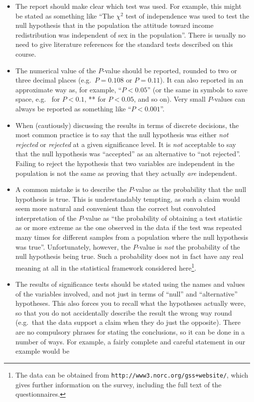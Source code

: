 \documentclass[11pt,a4paper,openany]{book}
\let\rmarkdownfootnote\footnote%
\def\footnote{\protect\rmarkdownfootnote}
\begin{document}
\begin{itemize}
\item
  The report should make clear which test was used. For example, this
  might be stated as something like ``The \(\chi^{2}\) test of
  independence was used to test the null hypothesis that in the
  population the attitude toward income redistribution was independent
  of sex in the population''. There is usually no need to give
  literature references for the standard tests described on this course.
\item
  The numerical value of the \(P\)-value should be reported, rounded to
  two or three decimal places (e.g.~\(P=0.108\) or \(P=0.11\)). It can
  also reported in an approximate way as, for example, ``\(P<0.05\)''
  (or the same in symbols to save space, e.g.~ for \(P<0.1\), ** for
  \(P<0.05\), and so on). Very small \(P\)-values can always be reported
  as something like ``\(P<0.001\)''.
\item
  When (cautiously) discussing the results in terms of discrete
  decisions, the most common practice is to say that the null hypothesis
  was either \emph{not rejected} or \emph{rejected} at a given
  significance level. It is \emph{not} acceptable to say that the null
  hypothesis was ``accepted'' as an alternative to ``not rejected''.
  Failing to reject the hypothesis that two variables are independent in
  the population is not the same as proving that they actually
  \emph{are} independent.
\item
  A common mistake is to describe the \(P\)-value as the probability
  that the null hypothesis is true. This is understandably tempting, as
  such a claim would seem more natural and convenient than the correct
  but convoluted interpretation of the \(P\)-value as ``the probability
  of obtaining a test statistic as or more extreme as the one observed
  in the data if the test was repeated many times for different samples
  from a population where the null hypothesis was true''. Unfortunately,
  however, the \(P\)-value is \emph{not} the probability of the null
  hypothesis being true. Such a probability does not in fact have any
  real meaning at all in the statistical framework considered
  here\footnote{The data can be obtained from
    \texttt{http://www3.norc.org/gss+website/}, which gives further
    information on the survey, including the full text of the
    questionnaires.}.
\item
  The results of significance tests should be stated using the names and
  values of the variables involved, and not just in terms of ``null''
  and ``alternative'' hypotheses. This also forces you to recall what
  the hypotheses actually were, so that you do not accidentally describe
  the result the wrong way round (e.g.~that the data support a claim
  when they do just the opposite). There are no compulsory phrases for
  stating the conclusions, so it can be done in a number of ways. For
  example, a fairly complete and careful statement in our example would
  be


\end{itemize}
\end{document}

